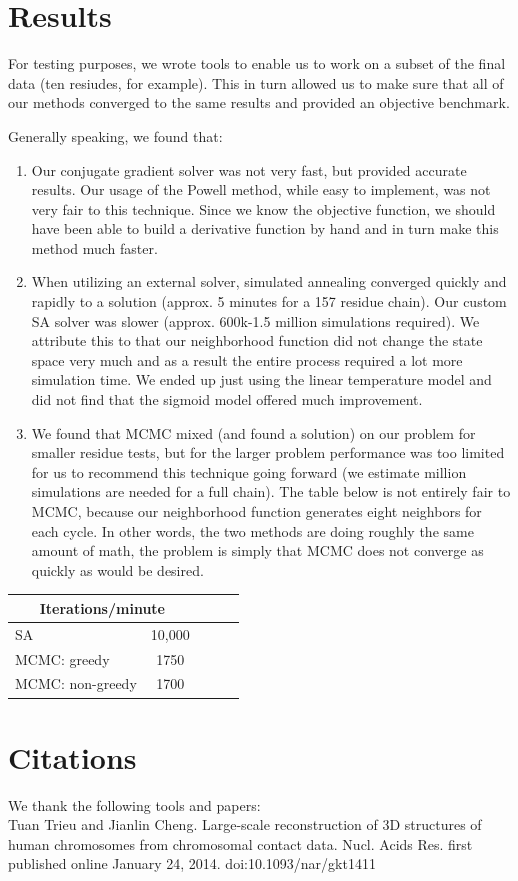 \documentclass{article}
\begin{document}
\section{Results}

For testing purposes, we wrote tools to enable us to work on a subset of the final data (ten resiudes, for example).  This in turn allowed us to make sure that all of our methods converged to the same results and provided an objective benchmark.

Generally speaking, we found that:

\begin{enumerate}

\item Our conjugate gradient solver was not very fast, but provided accurate results.  Our usage of the Powell method, while easy to implement, was not very fair to this technique.  Since we know the objective function, we should have been able to build a derivative function by hand and in turn make this method much faster.

\item When utilizing an external solver, simulated annealing converged quickly and rapidly to a solution (approx. 5 minutes for a 157 residue chain).  Our custom SA solver was slower (approx. 600k-1.5 million simulations required).  We attribute this to that our neighborhood function did not change the state space very much and as a result the entire process required a lot more simulation time.  We ended up just using the linear temperature model and did not find that the sigmoid model offered much improvement.

\item We found that MCMC mixed (and found a solution) on our problem for smaller residue tests, but for the larger problem performance was too limited for us to recommend this technique going forward (we estimate  million simulations are needed for a full chain).  The table below is not entirely fair to MCMC, because our neighborhood function generates eight neighbors for each cycle.  In other words, the two methods are doing roughly the same amount of math, the problem is simply that MCMC does not converge as quickly as would be desired.\\

\end{enumerate}


\begin{center}
\begin{tabular}{|l|c|c|c|r|}
\multicolumn{2}{c}{Iterations/minute} \\
    \hline
    SA & 10,000 \\ \hline
    MCMC: greedy & 1750    \\ \hline
    MCMC: non-greedy & 1700    \\ \hline
    \end{tabular}
\end{center}

\section{Citations}

We thank the following tools and papers: \\

Tuan Trieu and Jianlin Cheng.  Large-scale reconstruction of 3D structures of human chromosomes from chromosomal contact data.  Nucl. Acids Res. first published online January 24, 2014. doi:10.1093/nar/gkt1411
\end{document}
